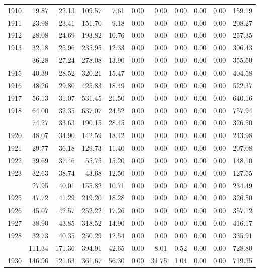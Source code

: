 \begin{longtable}[t]{rrrrrrrrrrr}
1910 & 19.87 & 22.13 & 109.57 & 7.61 & 0.00 & 0.00 & 0.00 & 0.00 & 0.00 & 159.19\\
1911 & 23.98 & 23.41 & 151.70 & 9.18 & 0.00 & 0.00 & 0.00 & 0.00 & 0.00 & 208.27\\
1912 & 28.08 & 24.69 & 193.82 & 10.76 & 0.00 & 0.00 & 0.00 & 0.00 & 0.00 & 257.35\\
1913 & 32.18 & 25.96 & 235.95 & 12.33 & 0.00 & 0.00 & 0.00 & 0.00 & 0.00 & 306.43\\
\addlinespace
1914 & 36.28 & 27.24 & 278.08 & 13.90 & 0.00 & 0.00 & 0.00 & 0.00 & 0.00 & 355.50\\
1915 & 40.39 & 28.52 & 320.21 & 15.47 & 0.00 & 0.00 & 0.00 & 0.00 & 0.00 & 404.58\\
1916 & 48.26 & 29.80 & 425.83 & 18.49 & 0.00 & 0.00 & 0.00 & 0.00 & 0.00 & 522.37\\
1917 & 56.13 & 31.07 & 531.45 & 21.50 & 0.00 & 0.00 & 0.00 & 0.00 & 0.00 & 640.16\\
1918 & 64.00 & 32.35 & 637.07 & 24.52 & 0.00 & 0.00 & 0.00 & 0.00 & 0.00 & 757.94\\
\addlinespace
1919 & 74.27 & 33.63 & 190.15 & 28.45 & 0.00 & 0.00 & 0.00 & 0.00 & 0.00 & 326.50\\
1920 & 48.07 & 34.90 & 142.59 & 18.42 & 0.00 & 0.00 & 0.00 & 0.00 & 0.00 & 243.98\\
1921 & 29.77 & 36.18 & 129.73 & 11.40 & 0.00 & 0.00 & 0.00 & 0.00 & 0.00 & 207.08\\
1922 & 39.69 & 37.46 & 55.75 & 15.20 & 0.00 & 0.00 & 0.00 & 0.00 & 0.00 & 148.10\\
1923 & 32.63 & 38.74 & 43.68 & 12.50 & 0.00 & 0.00 & 0.00 & 0.00 & 0.00 & 127.55\\
\addlinespace
1924 & 27.95 & 40.01 & 155.82 & 10.71 & 0.00 & 0.00 & 0.00 & 0.00 & 0.00 & 234.49\\
1925 & 47.72 & 41.29 & 219.20 & 18.28 & 0.00 & 0.00 & 0.00 & 0.00 & 0.00 & 326.50\\
1926 & 45.07 & 42.57 & 252.22 & 17.26 & 0.00 & 0.00 & 0.00 & 0.00 & 0.00 & 357.12\\
1927 & 38.90 & 43.85 & 318.52 & 14.90 & 0.00 & 0.00 & 0.00 & 0.00 & 0.00 & 416.17\\
1928 & 32.73 & 40.35 & 250.29 & 12.54 & 0.00 & 0.00 & 0.00 & 0.00 & 0.00 & 335.91\\
\addlinespace
1929 & 111.34 & 171.36 & 394.91 & 42.65 & 0.00 & 8.01 & 0.52 & 0.00 & 0.00 & 728.80\\
1930 & 146.96 & 121.63 & 361.67 & 56.30 & 0.00 & 31.75 & 1.04 & 0.00 & 0.00 & 719.35\\

\end{longtable}

